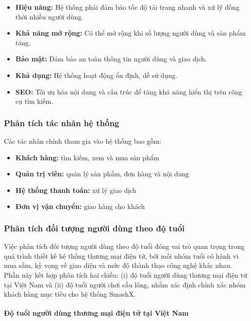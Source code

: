 \documentclass[13pt]{article}
\begin{document}
\begin{itemize}
    \item \textbf{Hiệu năng:} Hệ thống phải đảm bảo tốc độ tải trang nhanh và xử lý đồng thời nhiều người dùng.
    \item \textbf{Khả năng mở rộng:} Có thể mở rộng khi số lượng người dùng và sản phẩm tăng.
    \item \textbf{Bảo mật:} Đảm bảo an toàn thông tin người dùng và giao dịch.
    \item \textbf{Khả dụng:} Hệ thống hoạt động ổn định, dễ sử dụng.
    \item \textbf{SEO:} Tối ưu hóa nội dung và cấu trúc để tăng khả năng hiển thị trên công cụ tìm kiếm.
\end{itemize}

\subsubsection{Phân tích tác nhân hệ thống}

Các tác nhân chính tham gia vào hệ thống bao gồm:

\begin{itemize}
    \item \textbf{Khách hàng:} tìm kiếm, xem và mua sản phẩm
    \item \textbf{Quản trị viên:} quản lý sản phẩm, đơn hàng và nội dung
    \item \textbf{Hệ thống thanh toán:} xử lý giao dịch
    \item \textbf{Đơn vị vận chuyển:} giao hàng cho khách
\end{itemize}

\subsubsection{Phân tích đối tượng người dùng theo độ tuổi}

Việc phân tích đối tượng người dùng theo độ tuổi đóng vai trò quan trọng trong quá trình thiết kế hệ thống thương mại điện tử, bởi mỗi nhóm tuổi có hành vi mua sắm, kỳ vọng về giao diện và mức độ thành thạo công nghệ khác nhau. Phần này kết hợp phân tích hai chiều: (i) độ tuổi người dùng thương mại điện tử tại Việt Nam và (ii) độ tuổi người chơi cầu lông, nhằm xác định chính xác nhóm khách hàng mục tiêu cho hệ thống SmashX.

\paragraph{Độ tuổi người dùng thương mại điện tử tại Việt Nam}
\end{document}
